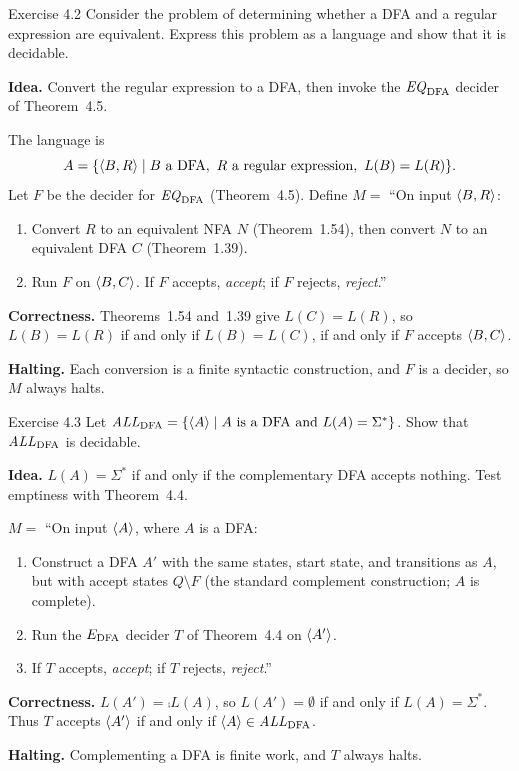 \begin{question}{Exercise 4.2}
Consider the problem of determining whether a DFA and a regular expression are equivalent. Express this problem as a language and show that it is decidable.
\end{question}
\begin{soln}
\textbf{Idea.} Convert the regular expression to a DFA, then invoke the $\mathit{EQ}_{\mathrm{DFA}}$ decider of Theorem~4.5.

The language is
\[
A=\{\langle B,R\rangle\mid B\text{ a DFA},\ R\text{ a regular expression},\ L(B)=L(R)\}.
\]
Let $F$ be the decider for $\mathit{EQ}_{\mathrm{DFA}}$ (Theorem~4.5). Define
$M=$ ``On input $\langle B,R\rangle$:
\begin{enumerate}
\item Convert $R$ to an equivalent NFA $N$ (Theorem~1.54), then convert $N$ to an equivalent DFA $C$ (Theorem~1.39).
\item Run $F$ on $\langle B,C\rangle$. If $F$ accepts, \emph{accept}; if $F$ rejects, \emph{reject}.''
\end{enumerate}

\textbf{Correctness.} Theorems~1.54 and~1.39 give $L(C)=L(R)$, so $L(B)=L(R)$ if and only if $L(B)=L(C)$, if and only if $F$ accepts $\langle B,C\rangle$.

\textbf{Halting.} Each conversion is a finite syntactic construction, and $F$ is a decider, so $M$ always halts.
\end{soln}

\begin{question}{Exercise 4.3}
Let $\mathit{ALL}_{\mathrm{DFA}}=\{\langle A\rangle\mid\text{$A$ is a DFA and $L(A)=\Sigma^*$}\}$. Show that $\mathit{ALL}_{\mathrm{DFA}}$ is decidable.
\end{question}
\begin{soln}
\textbf{Idea.} $L(A)=\Sigma^*$ if and only if the complementary DFA accepts nothing. Test emptiness with Theorem~4.4.

$M=$ ``On input $\langle A\rangle$, where $A$ is a DFA:
\begin{enumerate}
\item Construct a DFA $A'$ with the same states, start state, and transitions as $A$, but with accept states $Q\setminus F$ (the standard complement construction; $A$ is complete).
\item Run the $E_{\mathrm{DFA}}$ decider $T$ of Theorem~4.4 on $\langle A'\rangle$.
\item If $T$ accepts, \emph{accept}; if $T$ rejects, \emph{reject}.''
\end{enumerate}

\textbf{Correctness.} $L(A')=\comp{L(A)}$, so $L(A')=\emptyset$ if and only if $L(A)=\Sigma^*$. Thus $T$ accepts $\langle A'\rangle$ if and only if $\langle A\rangle\in\mathit{ALL}_{\mathrm{DFA}}$.

\textbf{Halting.} Complementing a DFA is finite work, and $T$ always halts.
\end{soln}

